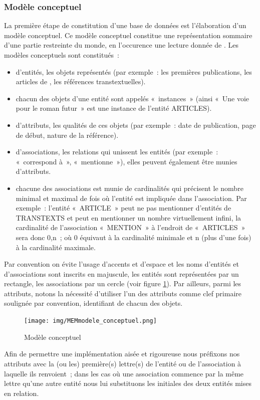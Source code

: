 \subsubsection{Modèle conceptuel}
\label{ref:db_modele_conceptuel}
 La première étape de constitution d'une base de données est l'élaboration d'un modèle conceptuel. Ce modèle conceptuel constitue une représentation sommaire d'une partie restreinte du monde, en l'occurence une lecture donnée de \punr. Les modèles conceptuels sont constitués~: 
    \begin{itemize}
        \item d'entités, les objets représentés (par exemple~: les premières publications, les articles de \punr{}, les références transtextuelles).
        \item chacun des objets d'une entité sont appelés «~instances~» (ainsi «~Une voie pour le roman futur~» est une instance de l'entité ARTICLES).
        \item d'attributs, les qualités de ces objets (par exemple~: date de publication, page de début, nature de la référence).
        \item d'associations, les relations qui unissent les entités (par exemple~: «~correspond à~», «~mentionne~»), elles peuvent également être munies d'attributs.
        \item chacune des associations est munie de cardinalités qui précisent le nombre minimal et maximal de fois où l’entité est impliquée dans l’association. Par exemple~: l'entité «~ARTICLE~» peut ne pas mentionner d'entités de TRANSTEXTS et peut en mentionner un nombre virtuellement infini, la cardinalité de l'association «~MENTION~» à l'endroit de «~ARTICLES~» sera donc 0,n~; où 0 équivaut à la cardinalité minimale et n (plus d'une fois) à la cardinalité maximale.
    \end{itemize}
    Par convention on évite l'usage d'accents et d'espace et les noms d'entités et d'associations sont inscrits en majuscule, les entités sont représentées par un rectangle, les associations par un cercle (voir figure \ref{concept}). Par ailleurs, parmi les attributs, notons la nécessité d'utiliser l'un des attributs comme clef primaire soulignée par convention, identifiant de chacun des objets.


\begin{figure}[H]
    \centering
    \texttt{[image: img/MEMmodele\_conceptuel.png]}
    \caption{Modèle conceptuel}
    \label{concept}
\end{figure}
Afin de permettre une implémentation aisée et rigoureuse nous préfixons nos attributs avec la (ou les) première(s) lettre(s) de l'entité ou de l'association à laquelle ils renvoient~; dans les cas où une association commence par la même lettre qu'une autre entité nous lui substituons les initiales des deux entités mises en relation.

